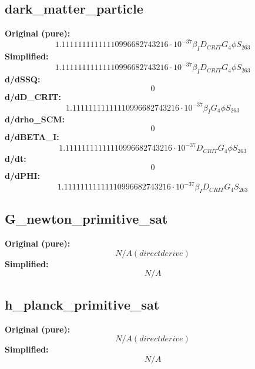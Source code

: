 \subsection{dark_matter_particle}
\textbf{Original (pure):}
\begin{equation}
1.11111111111110996682743216 \cdot 10^{-37} \beta_{I} D_{CRIT} G_{4} \phi S_{26 3}
\end{equation}
\textbf{Simplified:}
\begin{equation}
1.11111111111110996682743216 \cdot 10^{-37} \beta_{I} D_{CRIT} G_{4} \phi S_{26 3}
\end{equation}
\textbf{d/dSSQ:}
\begin{equation}
0
\end{equation}
\textbf{d/dD_CRIT:}
\begin{equation}
1.11111111111110996682743216 \cdot 10^{-37} \beta_{I} G_{4} \phi S_{26 3}
\end{equation}
\textbf{d/drho_SCM:}
\begin{equation}
0
\end{equation}
\textbf{d/dBETA_I:}
\begin{equation}
1.11111111111110996682743216 \cdot 10^{-37} D_{CRIT} G_{4} \phi S_{26 3}
\end{equation}
\textbf{d/dt:}
\begin{equation}
0
\end{equation}
\textbf{d/dPHI:}
\begin{equation}
1.11111111111110996682743216 \cdot 10^{-37} \beta_{I} D_{CRIT} G_{4} S_{26 3}
\end{equation}

\subsection{G_newton_primitive_sat}
\textbf{Original (pure):}
\begin{equation}
N/A (direct derive)
\end{equation}
\textbf{Simplified:}
\begin{equation}
N/A
\end{equation}

\subsection{h_planck_primitive_sat}
\textbf{Original (pure):}
\begin{equation}
N/A (direct derive)
\end{equation}
\textbf{Simplified:}
\begin{equation}
N/A
\end{equation}

